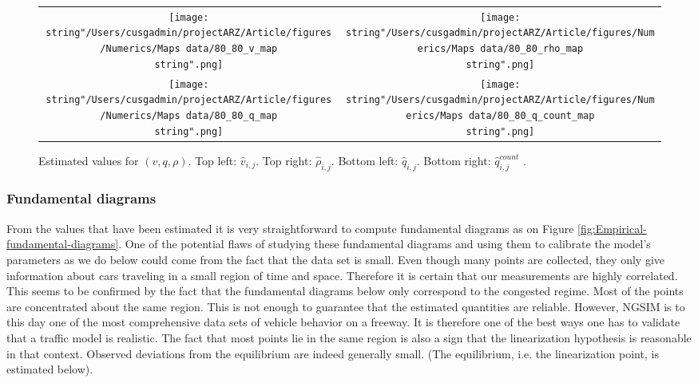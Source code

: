 \documentclass[preprint]{elsarticle}
\begin{document}
\begin{figure}
\begin{centering}
\begin{tabular}{cc}
\texttt{[image: \\string"/Users/cusgadmin/projectARZ/Article/figures/Numerics/Maps data/80\_80\_v\_map\\string".png]} & \texttt{[image: \\string"/Users/cusgadmin/projectARZ/Article/figures/Numerics/Maps data/80\_80\_rho\_map\\string".png]}\tabularnewline
\texttt{[image: \\string"/Users/cusgadmin/projectARZ/Article/figures/Numerics/Maps data/80\_80\_q\_map\\string".png]} & \texttt{[image: \\string"/Users/cusgadmin/projectARZ/Article/figures/Numerics/Maps data/80\_80\_q\_count\_map\\string".png]}\tabularnewline
\end{tabular}
\par\end{centering}

\protect\caption{Estimated values for $\left(v,q,\rho\right)$. Top left: $\widehat{v}_{i,j}$.
Top right: $\widehat{\rho}_{i,j}$. Bottom left: $\widehat{q}_{i,j}$.
Bottom right: $\widehat{q}_{i,j}^{count}$ .\label{fig:Estimated-values}}


\end{figure}



\subsubsection{Fundamental diagrams}

From the values that have been estimated it is very straightforward
to compute fundamental diagrams as on Figure \ref{fig:Empirical-fundamental-diagrams}.
One of the potential flaws of studying these fundamental diagrams
and using them to calibrate the model's parameters as we do below
could come from the fact that the data set is small. Even though many
points are collected, they only give information about cars traveling
in a small region of time and space. Therefore it is certain that
our measurements are highly correlated. This seems
to be confirmed by the fact that the fundamental diagrams below only
correspond to the congested regime. Most of the points are concentrated
about the same region. This is not enough to guarantee that the estimated
quantities are reliable. However, NGSIM is to this day one of the
most comprehensive data sets of vehicle behavior on a freeway. It
is therefore one of the best ways one has to validate that a traffic
model is realistic. The fact that most points lie in the same region
is also a sign that the linearization hypothesis is reasonable
in that context. Observed deviations from the equilibrium are indeed
generally small. (The equilibrium, i.e. the linearization point, is estimated
below).
\end{document}
